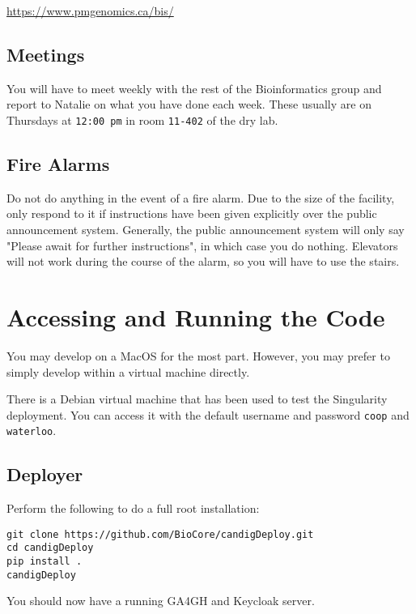 \documentclass{article}
\begin{document}
\url{https://www.pmgenomics.ca/bis/}



\subsection{Meetings}

You will have to meet weekly with the rest of the Bioinformatics group and report to Natalie on what you have done each week. These usually are on Thursdays at \texttt{12:00 pm} in room \texttt{11-402} of the dry lab.

\subsection{Fire Alarms}
Do not do anything in the event of a fire alarm. Due to the size 
of the facility, only respond to it if instructions have been given 
explicitly over the public announcement system. Generally, the public announcement  system will only say "Please await for further instructions", in which case you do nothing. Elevators will not work during the course of the alarm, so you will have to 
use the stairs.

\newpage

\section{Accessing and Running the Code}

You may develop on a MacOS for the most part.
However, you may prefer to simply develop within a virtual machine directly.

There is a Debian virtual machine that has been used to test the Singularity deployment.
You can access it with the default username and password \texttt{coop} and \texttt{waterloo}.

\subsection{Deployer}

Perform the following to do a full root installation:
\begin{verbatim}
git clone https://github.com/BioCore/candigDeploy.git
cd candigDeploy
pip install .
candigDeploy
\end{verbatim}
You should now have a running GA4GH and Keycloak server.
\end{document}
